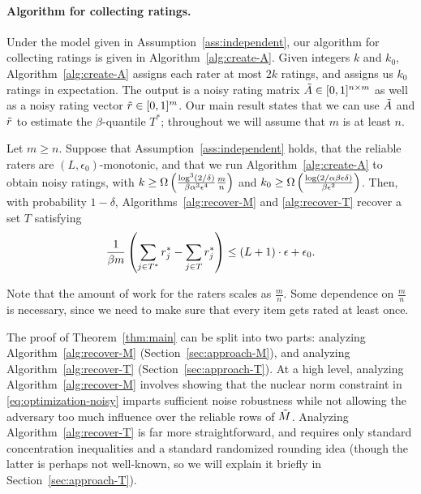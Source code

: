 \paragraph{Algorithm for collecting ratings.}
Under the model given in Assumption~\ref{ass:independent}, 
our algorithm for collecting ratings is given in 
Algorithm~\ref{alg:create-A}. Given integers $k$ and $k_0$, 
Algorithm~\ref{alg:create-A} assigns each rater at most $2k$ 
ratings, and assigns us $k_0$ ratings in expectation. The output is a 
noisy rating matrix $\tilde{A} \in [0,1]^{n \times m}$ as well 
as a noisy rating vector $\tilde{r} \in [0,1]^m$.
Our main result states that we can use $\tilde{A}$ and $\tilde{r}$ to 
estimate the $\beta$-quantile $T^*$; throughout we will assume 
that $m$ is at least $n$.
\begin{theorem}
\label{thm:main}
Let $m \geq n$. 
Suppose that Assumption~\ref{ass:independent} holds, that 
the reliable raters are $(L,\epsilon_0)$-monotonic, and 
that we run Algorithm~\ref{alg:create-A} to obtain noisy ratings, 
with $k \geq \Omega\left( \frac{\log^3(2/\delta)}{\beta\alpha^3\epsilon^4}\frac{m}{n} \right)$ and
$k_0 \geq \Omega\left( \frac{\log(2/\alpha\beta\epsilon\delta)}{\beta\epsilon^2} \right)$.
Then, with probability $1-\delta$, 
Algorithms~\ref{alg:recover-M} and \ref{alg:recover-T} recover a set $T$ satisfying 
\vskip -0.18in
\[ \frac{1}{\beta m} \left( \sum_{j \in T^*} r^*_j - \sum_{j \in T} r^*_j \right) 
\leq (L+1) \cdot \epsilon + \epsilon_0. \]
\vskip -0.07in
\end{theorem}
Note that the amount of work for the raters scales as $\frac{m}{n}$. Some dependence 
on $\frac{m}{n}$ is necessary, since we need to make sure that every item gets rated at least once.

The proof of Theorem~\ref{thm:main} can be split into two parts: analyzing 
Algorithm~\ref{alg:recover-M} (Section~\ref{sec:approach-M}), 
and analyzing Algorithm~\ref{alg:recover-T} (Section~\ref{sec:approach-T}). 
At a high level, analyzing Algorithm~\ref{alg:recover-M} involves showing that 
the nuclear norm constraint in \eqref{eq:optimization-noisy} imparts sufficient 
noise robustness while not allowing the adversary too much influence over the 
reliable rows of $\tilde{M}$. Analyzing Algorithm~\ref{alg:recover-T} is far more 
straightforward, 
and requires only standard concentration inequalities and a standard randomized 
rounding idea (though the latter is perhaps not well-known, so we will explain 
it briefly in Section~\ref{sec:approach-T}).


